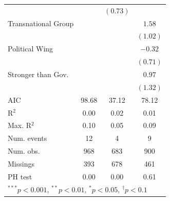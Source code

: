 \documentclass[12pt,]{book}
\let\origtable\table
\let\endorigtable\endtable
\renewenvironment{table}[1][2] {
    \singlespacing
    \expandafter\origtable\expandafter[H]
} {
    \endorigtable
}
\theoremstyle{definition}
\theoremstyle{definition}
\theoremstyle{definition}
\theoremstyle{remark}
\begin{document}
\begin{table}
\begin{center}
\begin{tabular}{l c c c }
                                  &          & $(0.73)$          &          \\
Transnational Group               &          &                   & $1.58$   \\
                                  &          &                   & $(1.02)$ \\
Political Wing                    &          &                   & $-0.32$  \\
                                  &          &                   & $(0.71)$ \\
Stronger than Gov.                &          &                   & $0.97$   \\
                                  &          &                   & $(1.32)$ \\
\hline
AIC                               & 98.68    & 37.12             & 78.12    \\
R$^2$                             & 0.00     & 0.02              & 0.01     \\
Max. R$^2$                        & 0.10     & 0.05              & 0.09     \\
Num. events                       & 12       & 4                 & 9        \\
Num. obs.                         & 968      & 683               & 900      \\
Missings                          & 393      & 678               & 461      \\
PH test                           & 0.00     & 0.00              & 0.61     \\
\hline
\multicolumn{4}{l}{\scriptsize{$^{***}p<0.001$, $^{**}p<0.01$, $^*p<0.05$, $^{\dagger}p<0.1$}}
\end{tabular}
\caption{Cox Proportional Hazard Models of Rebel Group Splintering (Central Govt Conflicts Only)}
\label{tab:survival-govt}
\end{center}
\end{table}
\end{document}
